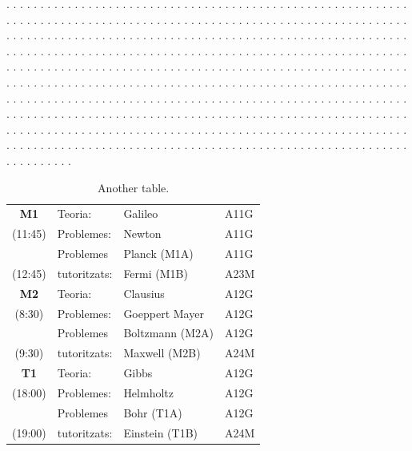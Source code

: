 \documentclass[twocolumn]{revtex4}
\begin{document}
. . . . . . . . . . . . . . . . . . . . . . . . . . . . . . . . . . . . . . . .
. . . . . . . . . . . . . . . . . . . . . . . . . . . . . . . . . . . . . . . .
. . . . . . . . . . . . . . . . . . . . . . . . . . . . . . . . . . . . . . . .
. . . . . . . . . . . . . . . . . . . . . . . . . . . . . . . . . . . . . . . .
. . . . . . . . . . . . . . . . . . . . . . . . . . . . . . . . . . . . . . . .
. . . . . . . . . . . . . . . . . . . . . . . . . . . . . . . . . . . . . . . .
. . . . . . . . . . . . . . . . . . . . . . . . . . . . . . . . . . . . . . . .
. . . . . . . . . . . . . . . . . . . . . . . . . . . . . . . . . . . . . . . .
. . . . . . . . . . . . . . . . . . . . . . . . . . . . . . . . . . . . . . . .
. . . . . . . . . . . . . . . . . . . . . . . . . . . . . . . . . . . . . . . .
. . . . . . . . . . . . . . . . . . . . . . . . . . . . . . . . . . . . . . . .
. . . . . . . . . . . . . . . . . . . . . . . . . . . . . . . . . . . . . . . .
. . . . . . . . . . . . . . . . . . . . . . . . . . . . . . . . . . . . . . . .
. . . . . . . . . . . . . . . . . . . . . . . . . . . . . . . . . . . . . . . .
. . . . . . . . . . . . . . . . . . . . . . . . . . . . . . . . . . . . . . . .

\begin{table}[h!]
\centering
\caption{Another table.}
\label{tab:sample2}
\vspace*{2mm}
\begin{tabular}{||c||l|l|l||} \hline \hline
{\bf M1}  & Teoria:      & Galileo         & A11G \\ \cline{2-4}
 (11:45)  & Problemes:   & Newton          & A11G \\ \cline{1-4}
          & Problemes    & Planck (M1A)    & A11G \\ \cline{3-4}
 (12:45)  & tutoritzats: & Fermi (M1B)     & A23M \\
\hline \hline
{\bf M2}  & Teoria:      & Clausius        & A12G \\ \cline{2-4}
 (8:30)   & Problemes:   & Goeppert Mayer  & A12G \\ \cline{1-4}
          & Problemes    & Boltzmann (M2A) & A12G \\ \cline{3-4}
 (9:30)   & tutoritzats: & Maxwell (M2B)   & A24M \\
\hline \hline
{\bf T1}  & Teoria:      & Gibbs           & A12G \\ \cline{2-4}
 (18:00)  & Problemes:   & Helmholtz       & A12G \\ \cline{1-4}
          & Problemes    & Bohr (T1A)      & A12G \\ \cline{3-4}
 (19:00)  & tutoritzats: & Einstein (T1B)  & A24M \\
\hline \hline
\end{tabular}
\end{table}
\end{document}
